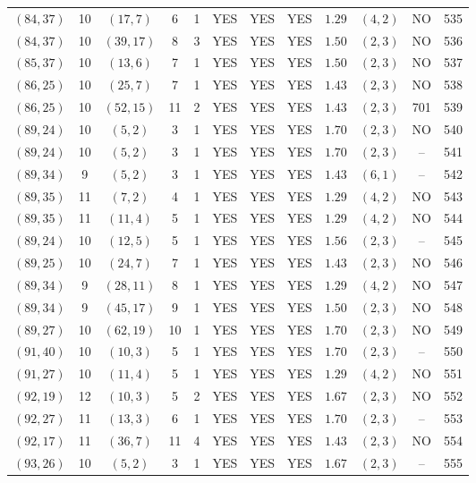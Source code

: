 \begin{longtable}{|c|c|c|c|c|c|c|c|c|c|c|c|}
$(84,37)$ & 10 & $(17,7)$ & 6 & 1 & YES & YES & YES & $1.29$ & $(4,2)$ & NO & 535\\
$(84,37)$ & 10 & $(39,17)$ & 8 & 3 & YES & YES & YES & $1.50$ & $(2,3)$ & NO & 536\\
$(85,37)$ & 10 & $(13,6)$ & 7 & 1 & YES & YES & YES & $1.50$ & $(2,3)$ & NO & 537\\
$(86,25)$ & 10 & $(25,7)$ & 7 & 1 & YES & YES & YES & $1.43$ & $(2,3)$ & NO & 538\\
$(86,25)$ & 10 & $(52,15)$ & 11 & 2 & YES & YES & YES & $1.43$ & $(2,3)$ & 701 & 539\\
$(89,24)$ & 10 & $(5,2)$ & 3 & 1 & YES & YES & YES & $1.70$ & $(2,3)$ & NO & 540\\
$(89,24)$ & 10 & $(5,2)$ & 3 & 1 & YES & YES & YES & $1.70$ & $(2,3)$ & -- & 541\\
$(89,34)$ & 9 & $(5,2)$ & 3 & 1 & YES & YES & YES & $1.43$ & $(6,1)$ & -- & 542\\
$(89,35)$ & 11 & $(7,2)$ & 4 & 1 & YES & YES & YES & $1.29$ & $(4,2)$ & NO & 543\\
$(89,35)$ & 11 & $(11,4)$ & 5 & 1 & YES & YES & YES & $1.29$ & $(4,2)$ & NO & 544\\
$(89,24)$ & 10 & $(12,5)$ & 5 & 1 & YES & YES & YES & $1.56$ & $(2,3)$ & -- & 545\\
$(89,25)$ & 10 & $(24,7)$ & 7 & 1 & YES & YES & YES & $1.43$ & $(2,3)$ & NO & 546\\
$(89,34)$ & 9 & $(28,11)$ & 8 & 1 & YES & YES & YES & $1.29$ & $(4,2)$ & NO & 547\\
$(89,34)$ & 9 & $(45,17)$ & 9 & 1 & YES & YES & YES & $1.50$ & $(2,3)$ & NO & 548\\
$(89,27)$ & 10 & $(62,19)$ & 10 & 1 & YES & YES & YES & $1.70$ & $(2,3)$ & NO & 549\\
$(91,40)$ & 10 & $(10,3)$ & 5 & 1 & YES & YES & YES & $1.70$ & $(2,3)$ & -- & 550\\
$(91,27)$ & 10 & $(11,4)$ & 5 & 1 & YES & YES & YES & $1.29$ & $(4,2)$ & NO & 551\\
$(92,19)$ & 12 & $(10,3)$ & 5 & 2 & YES & YES & YES & $1.67$ & $(2,3)$ & NO & 552\\
$(92,27)$ & 11 & $(13,3)$ & 6 & 1 & YES & YES & YES & $1.70$ & $(2,3)$ & -- & 553\\
$(92,17)$ & 11 & $(36,7)$ & 11 & 4 & YES & YES & YES & $1.43$ & $(2,3)$ & NO & 554\\
$(93,26)$ & 10 & $(5,2)$ & 3 & 1 & YES & YES & YES & $1.67$ & $(2,3)$ & -- & 555\\

\end{longtable}
